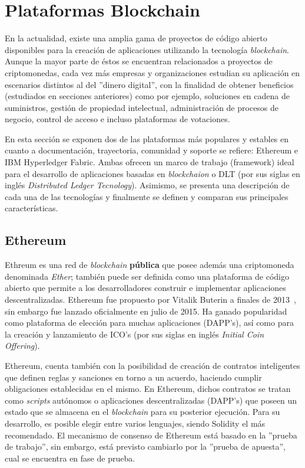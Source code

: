 \section {Plataformas Blockchain}

En la actualidad, existe una amplia gama de proyectos de código abierto disponibles para la creación de aplicaciones utilizando la tecnología \textit{blockchain}. Aunque la mayor parte de éstos se encuentran relacionados a proyectos de criptomonedas, cada vez más empresas y organizaciones estudian su aplicación en escenarios distintos al del ''dinero digital'', con la finalidad de obtener beneficios (estudiados en secciones anteriores) como por ejemplo, soluciones en cadena de suministros, gestión de propiedad intelectual, administración de procesos de negocio, control de acceso e incluso plataformas de votaciones.

En esta sección se exponen dos de las plataformas más populares y estables en cuanto a documentación, trayectoria, comunidad y soporte se refiere: Ethereum e IBM Hyperledger Fabric. Ambas ofrecen un marco de trabajo (framework) ideal para el desarrollo de aplicaciones basadas en \textit{blockchaion} o DLT (por sus siglas en inglés {\it Distributed Ledger Tecnology}). Asimismo, se presenta una descripción de cada una de las tecnologías y finalmente se definen y comparan sus principales características. 


\subsection{Ethereum}
Ethreum es una red de \textit{blockchain} \textbf{pública} que posee además una criptomoneda denominada \textit{Ether}; también puede ser definida como una plataforma de código abierto que permite a los desarrolladores construir e implementar aplicaciones descentralizadas. Ethereum fue propuesto por Vitalik Buterin a finales de 2013~\cite{wood2014ethereum}, sin embargo fue lanzado oficialmente en julio de 2015. Ha ganado popularidad como plataforma de elección para muchas aplicaciones (DAPP's), así como para la creación y lanzamiento de ICO's (por sus siglas en inglés {\it Initial Coin Offering}). 

Ethereum, cuenta también con la posibilidad de creación de contratos inteligentes que definen reglas y sanciones en torno a un acuerdo, haciendo cumplir obligaciones establecidas en el mismo. En Ethereum, dichos contratos se tratan como {\it scripts} autónomos o aplicaciones descentralizadas (DAPP's) que poseen un estado que se almacena en el \textit{blockchain} para su posterior ejecución. Para su desarrollo, es posible elegir entre varios lenguajes, siendo Solidity el más recomendado. El mecanismo de consenso de Ethereum está basado en la  ''prueba de trabajo'', sin embargo, está previsto cambiarlo por la ''prueba de apuesta'', cual se encuentra en fase de prueba.

